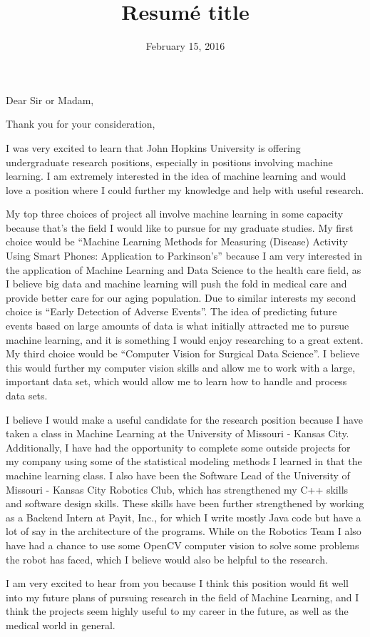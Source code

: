 \documentclass[11pt,a4paper,sans]{moderncv}        %
\title{Resumé title}                               %
\begin{document}
\date{February 15, 2016}
\opening{Dear Sir or Madam,}
\closing{Thank you for your consideration,}
\makelettertitle

I was very excited to learn that John Hopkins University is offering undergraduate research positions, especially in positions involving machine learning. I am extremely interested in the idea of machine learning and would love a position where I could further my knowledge and help with useful research.

My top three choices of project all involve machine learning in some capacity because that's the field I would like to pursue for my graduate studies. My first choice would be ``Machine Learning Methods for Measuring (Disease) Activity Using Smart Phones: Application to Parkinson’s'' because I am very interested in the application of Machine Learning and Data Science to the health care field, as I believe big data and machine learning will push the fold in medical care and provide better care for our aging population. Due to similar interests my second choice is ``Early Detection of Adverse Events''. The idea of predicting future events based on large amounts of data is what initially attracted me to pursue machine learning, and it is something I would enjoy researching to a great extent. My third choice would be ``Computer Vision for Surgical Data Science''. I believe this would further my computer vision skills and allow me to work with a large, important data set, which would allow me to learn how to handle and process data sets.

I believe I would make a useful candidate for the research position because I have taken a class in Machine Learning at the University of Missouri - Kansas City. Additionally, I have had the opportunity to complete some outside projects for my company using some of the statistical modeling methods I learned in that the machine learning class. I also have been the Software Lead of the University of Missouri - Kansas City Robotics Club, which has strengthened my C++ skills and software design skills. These skills have been further strengthened by working as a Backend Intern at Payit, Inc., for which I write mostly Java code but have a lot of say in the architecture of the programs. While on the Robotics Team I also have had a chance to use some OpenCV computer vision to solve some problems the robot has faced, which I believe would also be helpful to the research. 

I am very excited to hear from you because I think this position would fit well into my future plans of pursuing research in the field of Machine Learning, and I think the projects seem highly useful to my career in the future, as well as the medical world in general. 

 
\makeletterclosing
\end{document}

